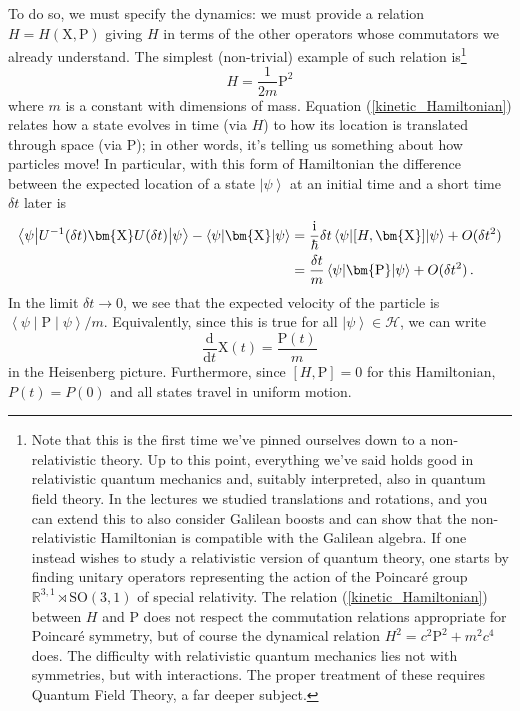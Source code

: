 \documentclass{article}
\theoremstyle{plain}\theoremheaderfont{\normalfont\itshape}\theorembodyfont{\rmfamily}\theoremseparator{.}\newtheorem*{rem}{Remark}\newtheorem*{ex}{Example}\newtheorem*{proof}{Proof}\newtheorem*{altp}{Alternative proof}
\theoremstyle{plain}\theoremheaderfont{\normalfont\bfseries}\theorembodyfont{\rmfamily}\theoremseparator{.}\newtheorem{thm}{Theorem}[section]\newtheorem{lem}[thm]{Lemma}\newtheorem{prop}[thm]{Proposition}\newtheorem*{cor}{Corollary}\newtheorem{defn}[thm]{Definition}\newtheorem{clm}[thm]{Claim}\newtheorem{clminproof}{Claim}
\theoremstyle{break}\theoremheaderfont{\normalfont\itshape}\theorembodyfont{\rmfamily}\theoremseparator{.\medskip}\newtheorem*{proofskip}{Proof}\newtheorem*{exs}{Examples}\newtheorem*{rems}{Remarks}
\theoremstyle{break}\theoremheaderfont{\normalfont\bfseries}\theorembodyfont{\rmfamily}\theoremseparator{.\medskip}\newtheorem{lemskip}[thm]{Lemma}\newtheorem{defnskip}[thm]{Definition}\newtheorem{propskip}[thm]{Proposition}\newtheorem{thmskip}[thm]{Theorem}
\numberwithin{equation}{section}
\newcommand{\ii}{\mathrm{i}}
\newcommand{\dv}[3][]{\frac{\mathrm{d}^{#1} #2}{{\mathrm{d} #3}^{#1}}}
\newcommand{\ket}[1]{\left| #1 \right\rangle}
\newcommand{\expval}[2]{\left\langle #2 \middle| #1 \middle| #2 \right\rangle}
\newcommand{\vb}[1]{\bm{\mathrm{#1}}}
\newcommand{\hb}{\mathcal{H}}
\newcommand{\RR}{\mathbb{R}}
\newcommand{\SO}{\mathrm{SO}}
\begin{document}
    To do so, we must specify the dynamics: we must provide a relation \(H=H(\vb{X},\vb{P})\) giving \(H\) in terms of the other operators whose commutators we already understand. The simplest (non-trivial) example of such relation is\footnote{Note that this is the first time we've pinned ourselves down to a non-relativistic theory. Up to this point, everything we've said holds good in relativistic quantum mechanics and, suitably interpreted, also in quantum field theory. In the lectures we studied translations and rotations, and you can extend this to also consider Galilean boosts and can show that the non-relativistic Hamiltonian is compatible with the Galilean algebra. If one instead wishes to study a relativistic version of quantum theory, one starts by finding unitary operators representing the action of the Poincar\'{e} group \(\RR^{3,1}\rtimes \SO(3,1)\) of special relativity. The relation (\ref{kinetic_Hamiltonian}) between \(H\) and \(\vb{P}\) does not respect the commutation relations appropriate for Poincar\'{e} symmetry, but of course the dynamical relation \(H^2=c^2\vb{P}^2+m^2c^4\) does. The difficulty with relativistic quantum mechanics lies not with symmetries, but with interactions. The proper treatment of these requires Quantum Field Theory, a far deeper subject.}
    \begin{equation}\label{kinetic_Hamiltonian}
        H=\frac{1}{2m}\vb{P}^2
    \end{equation}
    where \(m\) is a constant with dimensions of mass. Equation (\ref{kinetic_Hamiltonian}) relates how a state evolves in time (via \(H\)) to how its location is translated through space (via \(\vb{P}\)); in other words, it's telling us something about how particles move! In particular, with this form of Hamiltonian the difference between the expected location of a state \(\ket{\psi}\) at an initial time and a short time \(\delta t\) later is
    \begin{align}
        \expval{U^{-1}(\delta t)\vb{X}U(\delta t)}{\psi}-\expval{\vb{X}}{\psi}&=\frac{\ii}{\hbar}\delta t\expval{[H,\vb{X}]}{\psi}+O(\delta t^2)\notag\\
        &=\frac{\delta t}{m}\expval{\vb{P}}{\psi}+O(\delta t^2)\,.
    \end{align}
    In the limit \(\delta t\to 0\), we see that the expected velocity of the particle is \(\expval{\vb{P}}{\psi}/m\). Equivalently, since this is true for all \(\ket{\psi}\in\hb\), we can write
    \begin{equation}
        \dv{}{t}\vb{X}(t)=\frac{\vb{P}(t)}{m}
    \end{equation}
    in the Heisenberg picture. Furthermore, since \([H,\vb{P}]=0\) for this Hamiltonian, \(P(t)=P(0)\) and all states travel in uniform motion.
\end{document}

